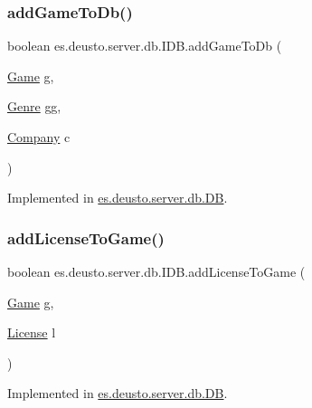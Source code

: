 \subsubsection{\texorpdfstring{add\+Game\+To\+Db()}{addGameToDb()}}
{\footnotesize\ttfamily boolean es.\+deusto.\+server.\+db.\+I\+D\+B.\+add\+Game\+To\+Db (\begin{DoxyParamCaption}\item[{\hyperlink{classes_1_1deusto_1_1server_1_1db_1_1data_1_1_game}{Game}}]{g,  }\item[{\hyperlink{classes_1_1deusto_1_1server_1_1db_1_1data_1_1_genre}{Genre}}]{gg,  }\item[{\hyperlink{classes_1_1deusto_1_1server_1_1db_1_1data_1_1_company}{Company}}]{c }\end{DoxyParamCaption})}



Implemented in \hyperlink{classes_1_1deusto_1_1server_1_1db_1_1_d_b_a376112d91f8e3018821fd9362f6598ae}{es.\+deusto.\+server.\+db.\+DB}.

\mbox{\label{interfacees_1_1deusto_1_1server_1_1db_1_1_i_d_b_a6ca49e0ed9bd7826c4ee65cb5f0f583b}} 
\subsubsection{\texorpdfstring{add\+License\+To\+Game()}{addLicenseToGame()}}
{\footnotesize\ttfamily boolean es.\+deusto.\+server.\+db.\+I\+D\+B.\+add\+License\+To\+Game (\begin{DoxyParamCaption}\item[{\hyperlink{classes_1_1deusto_1_1server_1_1db_1_1data_1_1_game}{Game}}]{g,  }\item[{\hyperlink{classes_1_1deusto_1_1server_1_1db_1_1data_1_1_license}{License}}]{l }\end{DoxyParamCaption})}



Implemented in \hyperlink{classes_1_1deusto_1_1server_1_1db_1_1_d_b_a5f4f68a9d2b7d6e8fbcc6e28136b92c8}{es.\+deusto.\+server.\+db.\+DB}.

\mbox{\label{interfacees_1_1deusto_1_1server_1_1db_1_1_i_d_b_ab2c9cbce259134d238e56eea5d0134c5}} 
